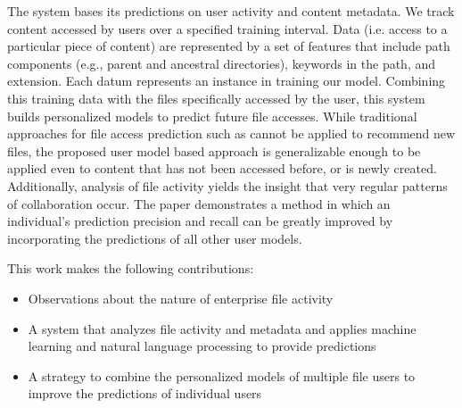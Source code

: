 {The system bases its predictions on user activity and content
metadata.  We track content accessed by users over a specified
training interval.  Data (i.e. access to a particular piece of
content) are represented by a set of features that include path
components (e.g., parent and ancestral directories), keywords in the
path, and extension.
Each datum represents an instance in training our model.  Combining
this training data with the files specifically accessed by the user,
this system builds personalized models to predict future file
accesses. While traditional approaches for file access prediction such
as \cite{yeh01-mascots,yeh01-ispass} cannot be applied to recommend
new files, the proposed user model based approach is generalizable
enough to be applied even to content that has not been accessed
before, or is newly created. Additionally, analysis of file activity
yields the insight that very regular patterns of collaboration occur.
The paper demonstrates a method in which an individual's prediction
precision and recall can be greatly improved by incorporating the
predictions of all other user models.

This work makes the following contributions:
\begin{itemize}
\item Observations about the nature of enterprise file activity
\item A system that analyzes file activity and metadata and applies
  machine learning and natural language processing to provide
  predictions
\item A strategy to combine the personalized models of multiple file
  users to improve the predictions of individual users
\end{itemize}

}
